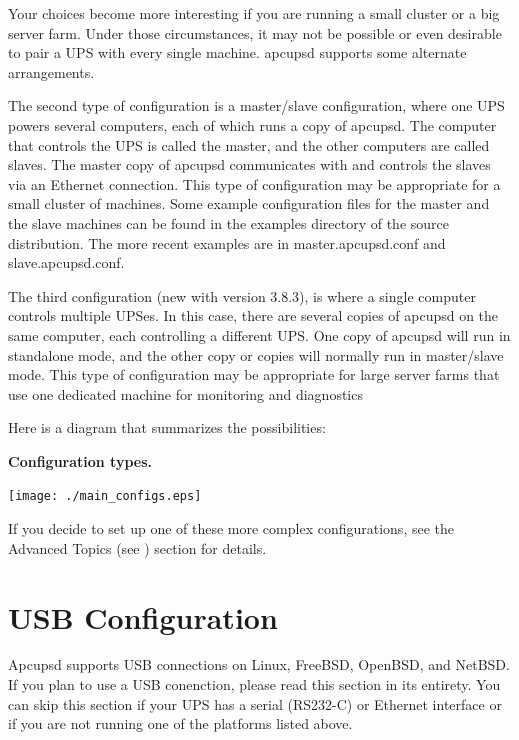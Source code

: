 Your choices become more interesting if you are running a small cluster or a
big server farm.  Under those circumstances, it may not be possible or even
desirable to pair a UPS with every single machine.  apcupsd supports some
alternate arrangements.  

The second type of configuration is a master/slave configuration, where one
UPS powers several computers, each of which runs a copy of apcupsd.  The
computer that controls the UPS is called the master, and the other computers
are called slaves.  The master copy of apcupsd communicates with and controls
the slaves via an Ethernet connection.  This type of configuration may be
appropriate for a small cluster of machines.  Some example configuration files
for the master and the slave machines can be found in the examples directory
of the source distribution.  The more recent examples are in
master.apcupsd.conf and slave.apcupsd.conf.  

The third configuration (new with version 3.8.3), is where a single computer
controls multiple UPSes. In this case, there are several copies of apcupsd on
the same computer, each controlling a different UPS. One copy of apcupsd will
run in standalone mode, and the other copy or copies will normally run in
master/slave mode.  This type of configuration may be appropriate for large
server farms that use one dedicated machine for monitoring and diagnostics  

Here is a diagram that summarizes the possibilities: 

\label{Configuration-types_005f}

{\bf Configuration types.}  

\texttt{[image: ./main\_configs.eps]}

If you decide to set up one of these more complex configurations, see the
Advanced Topics (see 
) section for details. 

\section*{USB Configuration}
\label{USB-Configuration}

Apcupsd supports USB connections on Linux, FreeBSD, OpenBSD, and NetBSD. If
you plan to use a USB conenction, please read this section in its entirety.
You can skip this section if your UPS has a serial (RS232-C) or Ethernet 
interface or if you are not running one of the platforms listed above. 


